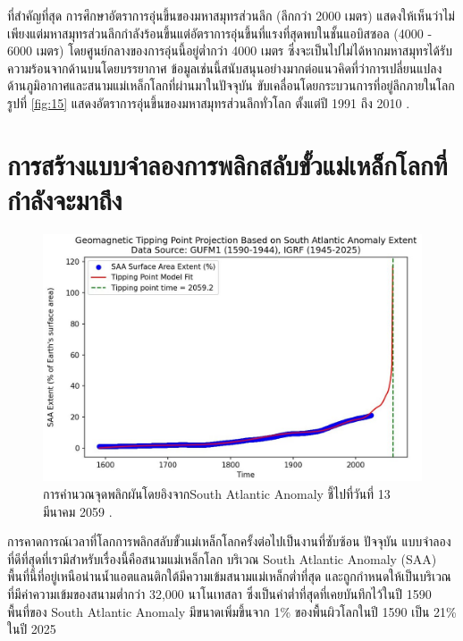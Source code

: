 \documentclass[10pt,twocolumn,letterpaper]{article}
\begin{document}
ที่สำคัญที่สุด การศึกษาอัตราการอุ่นขึ้นของมหาสมุทรส่วนลึก (ลึกกว่า 2000 เมตร) แสดงให้เห็นว่าไม่เพียงแต่มหาสมุทรส่วนลึกกำลังร้อนขึ้นแต่อัตราการอุ่นขึ้นที่แรงที่สุดพบในชั้นแอบิสซอล (4000 - 6000 เมตร) โดยศูนย์กลางของการอุ่นนี้อยู่ต่ำกว่า 4000 เมตร \cite{132,129} ซึ่งจะเป็นไปไม่ได้หากมหาสมุทรได้รับความร้อนจากด้านบนโดยบรรยากาศ ข้อมูลเช่นนี้สนับสนุนอย่างมากต่อแนวคิดที่ว่าการเปลี่ยนแปลงด้านภูมิอากาศและสนามแม่เหล็กโลกที่ผ่านมาในปัจจุบัน ขับเคลื่อนโดยกระบวนการที่อยู่ลึกภายในโลก รูปที่ \ref{fig:15} แสดงอัตราการอุ่นขึ้นของมหาสมุทรส่วนลึกทั่วโลก ตั้งแต่ปี 1991 ถึง 2010 \cite{132}.
\section{การสร้างแบบจำลองการพลิกสลับขั้วแม่เหล็กโลกที่กำลังจะมาถึง}

\begin{figure}[b]
\begin{center}
   \includegraphics[width=1\linewidth]{saa-crop.jpeg}
\end{center}
   \caption{การคำนวณจุดพลิกผันโดยอิงจากSouth Atlantic Anomaly ชี้ไปที่วันที่ 13 มีนาคม 2059 \cite{125,126}.}
\label{fig:16}
\label{fig:onecol}
\end{figure}

การคาดการณ์เวลาที่โลกการพลิกสลับขั้วแม่เหล็กโลกครั้งต่อไปเป็นงานที่ซับซ้อน ปัจจุบัน แบบจำลองที่ดีที่สุดที่เรามีสำหรับเรื่องนี้คือสนามแม่เหล็กโลก บริเวณ South Atlantic Anomaly (SAA) พื้นที่นี้ที่อยู่เหนือน่านน้ำแอตแลนติกใต้มีความเข้มสนามแม่เหล็กต่ำที่สุด และถูกกำหนดให้เป็นบริเวณที่มีค่าความเข้มของสนามต่ำกว่า 32,000 นาโนเทสลา \cite{135} ซึ่งเป็นค่าต่ำที่สุดที่เคยบันทึกไว้ในปี 1590 พื้นที่ของ South Atlantic Anomaly มีขนาดเพิ่มขึ้นจาก 1\% ของพื้นผิวโลกในปี 1590 เป็น 21\% ในปี 2025 \cite{136}
\end{document}
